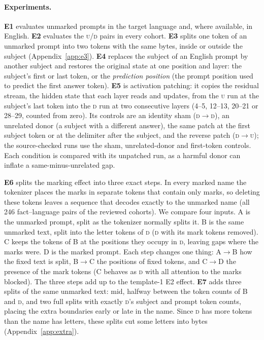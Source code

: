 \documentclass[11pt]{article}
\newcommand{\U}{\textsc{u}}
\newcommand{\D}{\textsc{d}}
\newcommand{\cA}{\textsf{A}}
\newcommand{\cB}{\textsf{B}}
\newcommand{\cC}{\textsf{C}}
\newcommand{\cD}{\textsf{D}}
\begin{document}
\paragraph{Experiments.}
\textbf{E1} evaluates unmarked prompts in the target language and, where
available, in English. \textbf{E2} evaluates the \U/\D{} pairs in every cohort. \textbf{E3} splits one token of an unmarked prompt into
two tokens with the same bytes, inside or outside the subject
(Appendix~\ref{app:e3}). \textbf{E4} replaces the subject of an English prompt by
another subject and restores the original state at one position and layer: the
subject's first or last token, or the \emph{prediction position} (the prompt
position used to predict the first answer token).
\textbf{E5} is activation patching: it copies the residual stream, the hidden
state that each layer reads and updates, from the \U{} run at the subject's last
token into the \D{} run at two consecutive layers (4--5, 12--13, 20--21 or
28--29, counted from zero). Its controls are an identity sham (\D$\to$\D), an unrelated donor (a subject with a different answer), the same patch at the first subject token or at the delimiter after the subject, and the reverse
patch (\D$\to$\U); the source-checked runs use the sham, unrelated-donor and
first-token controls. Each condition is compared with its unpatched run, as a harmful donor can inflate a same-minus-unrelated gap.

\textbf{E6} splits the marking effect into three exact steps. In every marked
name the tokenizer places the marks in separate tokens that contain only marks,
so deleting these tokens leaves a sequence that decodes exactly to the unmarked
name (all 246 fact--language pairs of the reviewed cohorts). We compare four
inputs. \cA{} is the unmarked prompt, split as the tokenizer normally splits it.
\cB{} is the same unmarked text, split into the letter tokens of \D{} (\D{}
with its mark tokens removed). \cC{} keeps the tokens of \cB{} at the positions
they occupy in \D{}, leaving gaps where the marks were. \cD{} is the marked
prompt. Each step changes one thing: \cA$\to$\cB{} how the fixed text is split,
\cB$\to$\cC{} the positions of fixed tokens, and \cC$\to$\cD{} the presence of
the mark tokens (\cC{} behaves as \D{} with all attention to the marks blocked). The three steps add up to the template-1 E2 effect. \textbf{E7} adds three splits of the same unmarked text:
\textsf{mid}, halfway between the token counts of \cB{} and \D, and two \textsf{full} splits with exactly \D's subject and prompt token counts,
placing the extra boundaries early or late in the name. Since \D{} has more
tokens than the name has letters, these splits cut some letters into bytes (Appendix~\ref{app:extra}).
\end{document}
